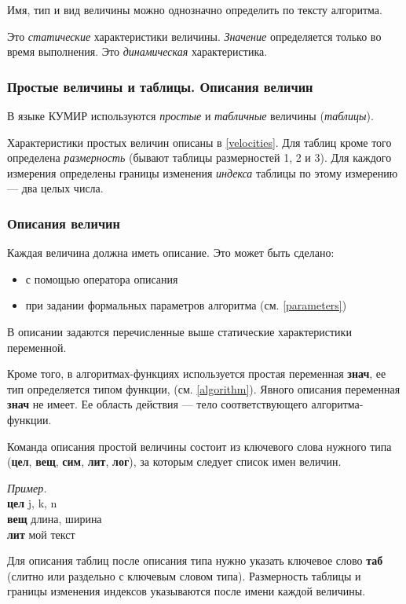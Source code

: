 \documentclass[12pt,a4paper]{article}
\begin{document}
	Имя, тип и вид величины можно однозначно определить по тексту алгоритма.

	Это \emph{статические} характеристики величины. \emph{Значение} определяется только во время выполнения. Это \emph{динамическая} характеристика.

\subsubsection{Простые величины и таблицы. Описания величин}

 В языке КУМИР используются \emph{простые} и \emph{табличные} величины (\emph{таблицы}).

	Характеристики простых величин описаны в \ref{velocities}. Для таблиц кроме того определена \emph{размерность} (бывают таблицы размерностей 1, 2 и 3). Для каждого измерения определены границы изменения \emph{индекса} таблицы по этому измерению --- два целых числа.

\subsubsection{Описания величин}
\label{declarations}

Каждая величина должна иметь описание.  Это может быть сделано:
\begin{itemize}
\item с помощью оператора описания
\item при задании формальных параметров алгоритма (см. \ref{parameters})
\end{itemize}

В описании задаются перечисленные выше статические характеристики переменной.

Кроме того, в алгоритмах-функциях используется простая переменная \textbf{знач}, ее тип определяется типом функции, (см. \ref{algorithm}). Явного описания переменная \textbf{знач} не имеет. Ее область действия --- тело соответствующего алгоритма-функции.

Команда описания простой величины состоит из ключевого слова нужного типа (\textbf{цел}, \textbf{вещ}, \textbf{сим}, \textbf{лит}, \textbf{лог}), за которым следует список имен величин.

\emph{Пример.}\\
{\sffamily
	\textbf{цел} j, k, n\\
	\textbf{вещ} длина, ширина\\
	\textbf{лит} мой текст
}

Для описания таблиц после описания типа нужно указать ключевое слово \textbf{таб} (слитно или раздельно с ключевым словом типа). Размерность таблицы и границы изменения индексов указываются после имени каждой величины.
\end{document}
